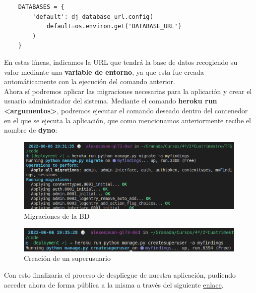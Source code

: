 \begin{verbatim}
    DATABASES = {
        'default': dj_database_url.config(
            default=os.environ.get('DATABASE_URL')
        )
    }
\end{verbatim}

En estas líneas, indicamos la URL que tendrá la base de datos recogiendo su valor mediante
una \textbf{variable de entorno}, ya que esta fue creada automáticamente con la ejecución
del comando anterior.\\

Ahora sí podremos aplicar las migraciones necesarias para la aplicación y crear el
usuario administrador del sistema. Mediante el comando \textbf{heroku run <argumentos>},
podremos ejecutar el comando deseado dentro del contenedor en el que se ejecuta la
aplicación, que como mencionamos anteriormente recibe el nombre de \textbf{dyno}:

    \begin{figure}[H]
        \centering
        \includegraphics[scale=0.50]{imagenes/heroku-migrate.png}
        \caption{Migraciones de la BD}
        \label{fig:heroku-migrate}
    \end{figure}

    \begin{figure}[H]
        \centering
        \includegraphics[scale=0.55]{imagenes/heroku-createsuperuser.png}
        \caption{Creación de un superusuario}
        \label{fig:heroku-createsuperuser}
    \end{figure}

Con esto finalizaría el proceso de despliegue de nuestra aplicación, pudiendo acceder
ahora de forma pública a la misma a través del siguiente
\href{https://myfindings.herokuapp.com/}{enlace}.
